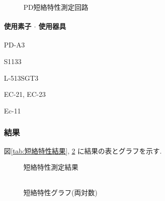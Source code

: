 \documentclass[titlepage]{jsarticle}
\begin{document}
            \begin{figure}[ht]
                \centering
                \caption{PD短絡特性測定回路}
                \label{fig:短絡特性回路}
            \end{figure}
            
            \paragraph{使用素子 $\cdot$ 使用器具}
                \begin{description}
                    \setlength{\leftskip}{1.5em}
                    \item[組立済回路] PD-A3
                    \item[PD] S1133
                    \item[LED] L-513SGT3
                    \item[デジタルマルチメータ] EC-21, EC-23
                    \item[直流電源] Ec-11
                \end{description}

        \subsubsection{結果}
            図\ref{tab:短絡特性結果}, \ref{fig:短絡特性グラフ}
            に結果の表とグラフを示す.

            \begin{figure}[ht]
                \def\@captype{table}
                \begin{minipage}{0.5\hsize}
                    \begin{center}
                        \caption{短絡特性測定結果}
                        \label{tab:短絡特性結果}
                        \begin{tabular}{c|c}
                            
                        \end{tabular}
                    \end{center}
                \end{minipage}
                \begin{minipage}{0.5\hsize}
                    \begin{center}
                        \caption{短絡特性グラフ(両対数)}
                        \label{fig:短絡特性グラフ}
                    \end{center}
                \end{minipage}
            \end{figure}
\end{document}

